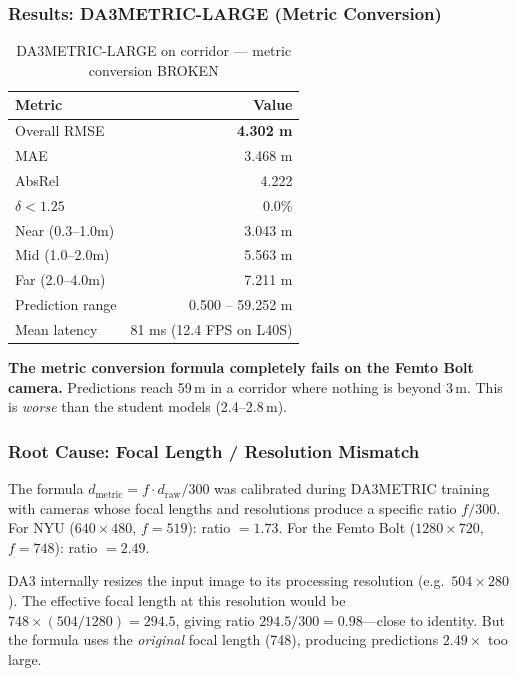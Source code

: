 \documentclass[11pt,a4paper]{article}
\begin{document}
\subsubsection{Results: DA3METRIC-LARGE (Metric Conversion)}

\begin{table}[h]
\centering
\caption{DA3METRIC-LARGE on corridor --- metric conversion BROKEN}
\label{tab:iter9-metric-large}
\begin{tabular}{lr}
\toprule
\textbf{Metric} & \textbf{Value} \\
\midrule
Overall RMSE      & \textcolor{regression}{\textbf{4.302 m}} \\
MAE               & 3.468 m \\
AbsRel            & 4.222 \\
$\delta < 1.25$   & 0.0\% \\
\midrule
Near (0.3--1.0m)  & 3.043 m \\
Mid (1.0--2.0m)   & 5.563 m \\
Far (2.0--4.0m)   & 7.211 m \\
\midrule
Prediction range  & 0.500 -- 59.252 m \\
Mean latency      & 81 ms (12.4 FPS on L40S) \\
\bottomrule
\end{tabular}
\end{table}

\textbf{The metric conversion formula completely fails on the Femto Bolt
camera.} Predictions reach 59\,m in a corridor where nothing is beyond
3\,m. This is \emph{worse} than the student models (2.4--2.8\,m).

\subsubsection{Root Cause: Focal Length / Resolution Mismatch}

The formula $d_{\text{metric}} = f \cdot d_{\text{raw}} / 300$ was
calibrated during DA3METRIC training with cameras whose focal lengths
and resolutions produce a specific ratio $f/300$. For NYU ($640 \times 480$,
$f = 519$): ratio $= 1.73$. For the Femto Bolt ($1280 \times 720$,
$f = 748$): ratio $= 2.49$.

DA3 internally resizes the input image to its processing resolution
(e.g.\ $504 \times 280$). The effective focal length at this resolution
would be $748 \times (504/1280) = 294.5$, giving ratio
$294.5/300 = 0.98$---close to identity. But the formula uses the
\emph{original} focal length (748), producing predictions $2.49\times$
too large.
\end{document}
